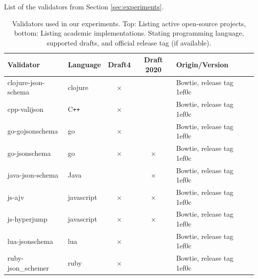 \begin{toappendix}
List of the validators from Section \ref{sec:experiments}.

\begin{table}[ht]
\centering


\caption{Validators used in our experiments. Top: Listing active open-source projects, bottom:
Listing academic implementations. Stating programming language, supported drafts, and official release tag (if available).}
\label{tab:validators}

\begin{tabular}{llccll}
\toprule
Validator & Language & Draft4 & Draft 2020 & Origin/Version\\
\midrule 
clojure-json-schema &  clojure & $\times$ & & Bowtie, release tag 1ef0c \\
%
cpp-valijson & C\texttt{++} & $\times$ &  &Bowtie, release tag 1ef0c \\
%
go-gojsonschema & go & $\times$ & & Bowtie, release tag 1ef0c\\
%
go-jsonschema & go & $\times$ & $\times$ &  Bowtie, release tag 1ef0c\\
%
java-json-schema& Java & & $\times$ & Bowtie, release tag 1ef0c \\
%
js-ajv & javascript & $\times$ & $\times$ & Bowtie, release tag 1ef0c\\
%
%
js-hyperjump & javascript & $\times$ & $\times$ &  Bowtie, release tag 1ef0c\\
% 
lua-jsonschema & lua & $\times$ & & Bowtie, release tag 1ef0c \\
%
ruby-json\_schemer & ruby & $\times$ & & Bowtie, release tag 1ef0c\\
%

\end{tabular}
\end{table}
\end{toappendix}
